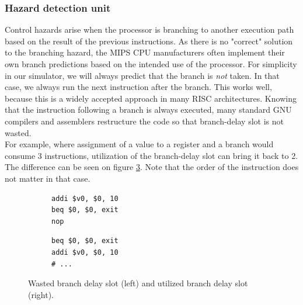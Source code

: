 \subsubsection{Hazard detection unit}
Control hazards arise when the processor is branching to another execution path
based on the result of the previous instructions. As there is no "correct"
solution to the branching hazard, the MIPS CPU manufacturers often implement
their own branch predictions based on the intended use of the processor. For
simplicity in our simulator, we will always predict that the branch is
\textit{not} taken. In that case, we always run the next instruction after the
branch. This works well, because this is a widely accepted approach in many
RISC architectures\cite{wiki:branch_delay_slots}.  Knowing that the instruction
following a branch is always executed, many standard GNU compilers and assemblers
restructure the code so that branch-delay slot is not wasted.\\
For example, where assignment of a value to a register and a branch would
consume 3 instructions, utilization of the branch-delay slot can bring it back
to 2. The difference can be seen on figure \ref{fig:branch_delay_slot_compare}.
Note that the order of the instruction does not matter in that case.
\begin{figure}[H]
    \centering
    \begin{subfigure}[t]{0.23\textwidth}
    \begin{lstlisting}[numbers=none]
addi $v0, $0, 10
beq $0, $0, exit
nop
    \end{lstlisting}
    \label{fig:non_utilized_branch_delay}

   \end{subfigure}
    \begin{subfigure}[t]{0.23\textwidth}
     \begin{lstlisting}[numbers=none]
beq $0, $0, exit
addi $v0, $0, 10
# ...
   \end{lstlisting}
        \label{fig:utilized_branch_delay}
    \end{subfigure}
\caption{Wasted branch delay slot (left) and utilized branch delay slot (right).}
\label{fig:branch_delay_slot_compare}
\end{figure}


